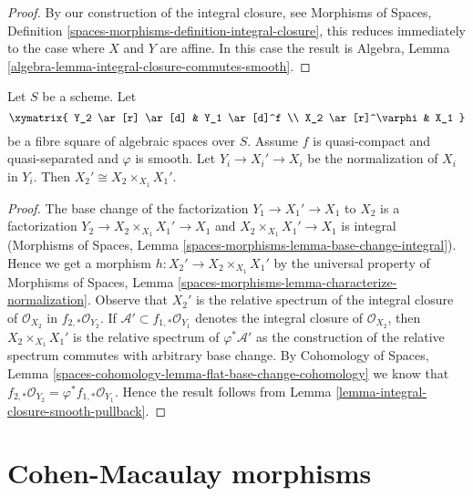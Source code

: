 \begin{proof}
By our construction of the integral closure, see
Morphisms of Spaces, Definition
\ref{spaces-morphisms-definition-integral-closure},
this reduces immediately to the case where $X$ and $Y$ are affine.
In this case the result is
Algebra, Lemma \ref{algebra-lemma-integral-closure-commutes-smooth}.
\end{proof}

\begin{lemma}
\label{lemma-normalization-smooth-localization}
Let $S$ be a scheme. Let
$$
\xymatrix{
Y_2 \ar[r] \ar[d] & Y_1 \ar[d]^f \\
X_2 \ar[r]^\varphi & X_1
}
$$
be a fibre square of algebraic spaces over $S$. Assume $f$ is quasi-compact
and quasi-separated and $\varphi$ is smooth.
Let $Y_i \to X_i' \to X_i$ be the normalization of $X_i$ in $Y_i$.
Then $X_2' \cong X_2 \times_{X_1} X_1'$.
\end{lemma}

\begin{proof}
The base change of the factorization $Y_1 \to X_1' \to X_1$ to $X_2$
is a factorization $Y_2 \to X_2 \times_{X_1} X_1' \to X_1$ and
$X_2 \times_{X_1} X_1' \to X_1$ is integral
(Morphisms of Spaces, Lemma \ref{spaces-morphisms-lemma-base-change-integral}).
Hence we get a morphism
$h : X_2' \to X_2 \times_{X_1} X_1'$ by the universal property of
Morphisms of Spaces, Lemma
\ref{spaces-morphisms-lemma-characterize-normalization}.
Observe that $X_2'$ is the relative spectrum of the integral closure
of $\mathcal{O}_{X_2}$ in $f_{2, *}\mathcal{O}_{Y_2}$.
If $\mathcal{A}' \subset f_{1, *}\mathcal{O}_{Y_1}$ denotes the integral
closure of $\mathcal{O}_{X_2}$, then $X_2 \times_{X_1} X_1'$ is the
relative spectrum of $\varphi^*\mathcal{A}'$ as the construction of
the relative spectrum commutes with arbitrary base change. By
Cohomology of Spaces, Lemma
\ref{spaces-cohomology-lemma-flat-base-change-cohomology}
we know that $f_{2, *}\mathcal{O}_{Y_2} = \varphi^*f_{1, *}\mathcal{O}_{Y_1}$.
Hence the result follows from
Lemma \ref{lemma-integral-closure-smooth-pullback}.
\end{proof}









\section{Cohen-Macaulay morphisms}
\label{section-CM}

